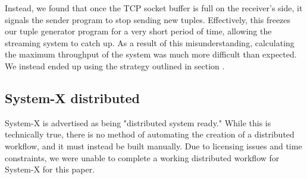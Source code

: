 Instead, we found that once the TCP socket buffer is full on the receiver's side, it signals the sender program to stop sending new tuples.  Effectively, this freezes our tuple generator program for a very short period of time, allowing the streaming system to catch up.  As a result of this misunderstanding, calculating the maximum throughput of the system was much more difficult than expected.  We instead ended up using the strategy outlined in section .

\subsection{System-X distributed}
System-X is advertised as being "distributed system ready."  While this is technically true, there is no method of automating the creation of a distributed workflow, and it must instead be built manually.  Due to licensing issues and time constraints, we were unable to complete a working distributed workflow for System-X for this paper.